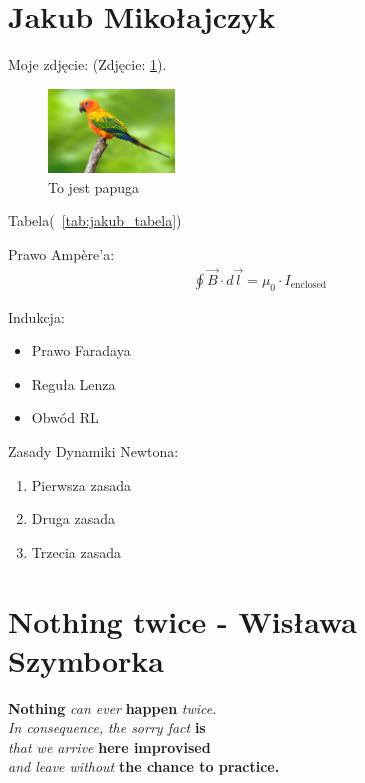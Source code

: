 \section{Jakub Mikołajczyk}

Moje zdjęcie: (Zdjęcie: \ref{fig:parrot}).

\begin{figure}[htbp]
    \centering
    \includegraphics[width=0.3\textwidth]{pictures/jakub.jpg} 
    \caption{To jest papuga}
    \label{fig:parrot}
\end{figure}

Tabela(~\ref{tab:jakub_tabela})



Prawo Ampère'a:
\begin{align}
\oint \vec{B} \cdot d\vec{l} = \mu_0 \cdot I_{\text{enclosed}}
\end{align}

Indukcja:
\begin{itemize}
  \item Prawo Faradaya
  \item Reguła Lenza
  \item Obwód RL
\end{itemize}

Zasady Dynamiki Newtona:
\begin{enumerate}
  \item Pierwsza zasada
  \item Druga zasada
  \item Trzecia zasada
\end{enumerate}



\section*{Nothing twice - Wisława Szymborka}


\begin{center}
\textbf{Nothing} \textit{can ever} \textbf{happen} \textsl{twice.}\\
\textit{In consequence,} \textsl{the sorry fact} \textbf{is}\\
\textsl{that we arrive} \textbf{here improvised}\\
\textit{and leave without} \textbf{the chance to practice.}
\end{center}



